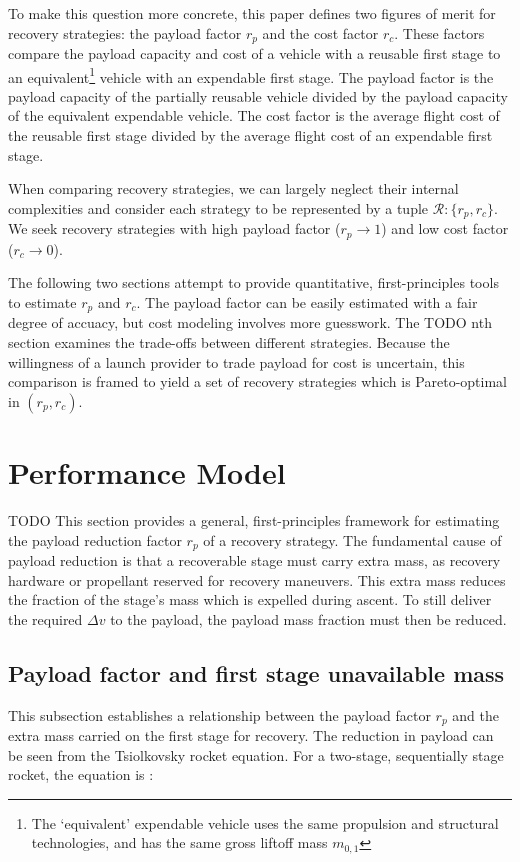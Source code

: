 \documentclass[conf]{new-aiaa}
\begin{document}
To make this question more concrete, this paper defines two figures of merit for recovery strategies: the payload factor $r_p$ and the cost factor $r_c$. These factors compare the payload capacity and cost of a vehicle with a reusable first stage to an equivalent\footnote{The `equivalent' expendable vehicle uses the same propulsion and structural technologies, and has the same gross liftoff mass $m_{0,1}$} vehicle with an expendable first stage. The payload factor is the payload capacity of the partially reusable vehicle divided by the payload capacity of the equivalent expendable vehicle. The cost factor is the average flight cost of the reusable first stage divided by the average flight cost of an expendable first stage.

When comparing recovery strategies, we can largely neglect their internal complexities and consider each strategy to be represented by a tuple $\mathcal{R}: \{r_p, r_c\}$. We seek recovery strategies with high payload factor ($r_p \rightarrow 1$) and low cost factor ($r_c \rightarrow 0$).

The following two sections attempt to provide quantitative, first-principles tools to estimate $r_p$ and $r_c$. The payload factor can be easily estimated with a fair degree of accuacy, but cost modeling involves more guesswork. The TODO nth section examines the trade-offs between different strategies. Because the willingness of a launch provider to trade payload for cost is uncertain, this comparison is framed to yield a set of recovery strategies which is Pareto-optimal in $(r_p, r_c)$.




\section{Performance Model}
TODO
This section provides a general, first-principles framework for estimating the payload reduction factor $r_p$ of a recovery strategy. The fundamental cause of payload reduction is that a recoverable stage must carry extra mass, as recovery hardware or propellant reserved for recovery maneuvers. This extra mass reduces the fraction of the stage's mass which is expelled during ascent. To still deliver the required $\Delta v$ to the payload, the payload mass fraction must then be reduced.

\subsection{Payload factor and first stage unavailable mass}
This subsection establishes a relationship between the payload factor $r_p$ and the extra mass carried on the first stage for recovery.
The reduction in payload can be seen from the Tsiolkovsky rocket equation. For a two-stage, sequentially stage rocket, the equation is \cite{Wiesel2010}:
\end{document}

